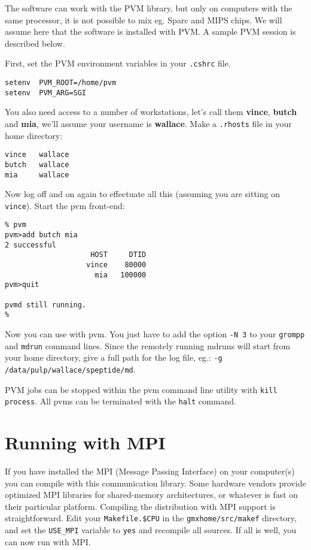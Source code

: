 The {\gromacs} software can work with the PVM library, but only
on computers with the same processor, it is not possible to mix
eg. Sparc and MIPS chips. We will assume
here that the software is installed with PVM. A sample PVM session
is described below.

First, set the PVM environment variables in your {\tt .cshrc} file.
\begin{verbatim}
setenv	PVM_ROOT=/home/pvm
setenv	PVM_ARG=SGI
\end{verbatim}
You also need access to a number of workstations, let's call them
{\bf vince}, {\bf butch} and {\bf mia}, we'll assume your username
is {\bf wallace}. Make a {\tt .rhosts} file in your home directory:
\begin{verbatim}
vince   wallace
butch   wallace
mia     wallace
\end{verbatim}
Now log off and on again to effectuate all this (assuming you are sitting on 
{\tt vince}). Start the pvm front-end: 
\begin{verbatim}
% pvm
pvm>add butch mia
2 successful
                    HOST     DTID
                   vince    80000
                     mia   100000
pvm>quit

pvmd still running.
%
\end{verbatim}
Now you can use {\gromacs} with pvm. You just have to add the option
{\tt -N 3} to your {\tt grompp} and {\tt mdrun} command lines. Since the
remotely running mdruns will start from your home directory, give a full 
path for the log file, eg.: {\tt -g /data/pulp/wallace/speptide/md}.

PVM jobs can be stopped within the pvm command line utility with
{\tt kill process}. All pvms can be terminated with the {\tt halt} command.

\section{Running with MPI}
If you have installed the MPI (Message Passing Interface) on your computer(s)
you can compile {\gromacs} with this communication library. Some
hardware vendors provide optimized MPI libraries for shared-memory
architectures, or whatever is fast on their particular platform.
Compiling the {\gromacs} distribution with MPI support is straightforward.
Edit your {\tt Makefile.\$CPU} in the {\tt gmxhome/src/makef} directory,
and set the {\tt USE\_MPI} variable to {\tt yes} and recompile all sources.
If all is well, you can now run with MPI. 

